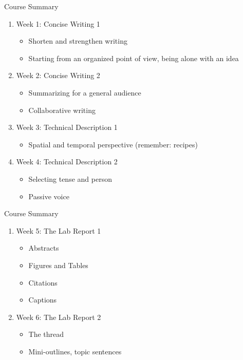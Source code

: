 \documentclass{beamer}
\begin{document}
\begin{frame}{Course Summary}
\begin{enumerate}
\item Week 1: Concise Writing 1
\begin{itemize}
\item Shorten and strengthen writing
\item Starting from an organized point of view, being alone with an idea
\end{itemize}
\item Week 2: Concise Writing 2
\begin{itemize}
\item Summarizing for a general audience
\item Collaborative writing
\end{itemize}
\item Week 3: Technical Description 1
\begin{itemize}
\item Spatial and temporal perspective (remember: recipes)
\end{itemize}
\item Week 4: Technical Description 2
\begin{itemize}
\item Selecting tense and person
\item Passive voice
\end{itemize}
\end{enumerate}
\end{frame}

\begin{frame}{Course Summary}
\small
\begin{enumerate}
\item Week 5: The Lab Report 1
\begin{itemize}
\item Abstracts
\item Figures and Tables
\item Citations
\item Captions
\end{itemize}
\item Week 6: The Lab Report 2
\begin{itemize}
\item The thread
\item Mini-outlines, topic sentences
\end{itemize}
\end{enumerate}
\end{frame}
\end{document}
